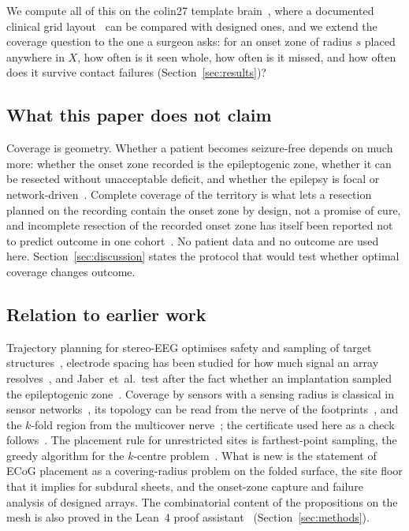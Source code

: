 \documentclass[11pt]{amsart}
\theoremstyle{definition}
\theoremstyle{remark}
\begin{document}
We compute all of this on the colin27 template
brain~\cite{Holmes1998,Oostenveld2011}, where a documented clinical grid
layout~\cite{Stolk2018} can be compared with designed ones, and we extend the
coverage question to the one a surgeon asks: for an onset zone of radius $s$
placed anywhere in $X$, how often is it seen whole, how often is it missed, and
how often does it survive contact failures (Section~\ref{sec:results})?

\subsection*{What this paper does not claim}
Coverage is geometry. Whether a patient becomes seizure-free depends on much
more: whether the onset zone recorded is the epileptogenic zone, whether it
can be resected without unacceptable deficit, and whether the epilepsy is
focal or network-driven~\cite{Spencer2002,Bartolomei2017}. Complete coverage of
the territory is what lets a resection planned on the recording contain the
onset zone by design, not a promise of cure, and incomplete resection of the
recorded onset zone has itself been reported not to predict outcome in one
cohort~\cite{Gascoigne2024}. No patient data and no outcome are used here.
Section~\ref{sec:discussion} states the protocol that would test whether
optimal coverage changes outcome.

\subsection*{Relation to earlier work}
Trajectory planning for stereo-EEG optimises safety and sampling of target
structures~\cite{DeMomi2014,Sparks2017}, electrode spacing has been studied
for how much signal an array resolves~\cite{Slutzky2010}, and
Jaber~et~al.\ test after the fact whether an implantation sampled the
epileptogenic zone~\cite{Jaber2024}. Coverage by sensors with a sensing radius
is classical in sensor networks~\cite{HuangTseng2005}, its topology can be read
from the nerve of the footprints~\cite{Borsuk1948,deSilvaGhrist2007}, and the
$k$-fold region from the multicover nerve~\cite{Sheehy2012}; the certificate
used here as a check follows~\cite{BhattacharjeeBhattacharya2026}. The
placement rule for unrestricted sites is farthest-point sampling, the greedy
algorithm for the $k$-centre problem~\cite{Gonzalez1985,HochbaumShmoys1985}. What is new is the
statement of ECoG placement as a covering-radius problem on the folded
surface, the site floor that it implies for subdural sheets, and the
onset-zone capture and failure analysis of designed arrays. The combinatorial
content of the propositions on the mesh is also proved in the Lean~4 proof
assistant~\cite{deMouraUllrich2021} (Section~\ref{sec:methods}).
\end{document}
